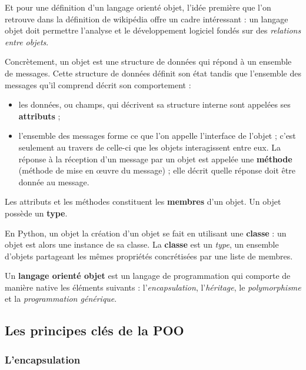 \documentclass[
  letterpaper,
  DIV=11,
  numbers=noendperiod]{scrartcl}
\providecommand{\tightlist}{%
  \setlength{\itemsep}{0pt}\setlength{\parskip}{0pt}}\usepackage{longtable,booktabs,array}
\begin{document}
Et pour une définition d'un langage orienté objet, l'idée première que
l'on retrouve dans la définition de wikipédia offre un cadre intéressant
: un langage objet doit permettre l'analyse et le développement logiciel
fondés sur des \emph{relations entre objets}.

Concrètement, un objet est une structure de données qui répond à un
ensemble de messages. Cette structure de données définit son état tandis
que l'ensemble des messages qu'il comprend décrit son comportement :

\begin{itemize}
\tightlist
\item
  les données, ou champs, qui décrivent sa structure interne sont
  appelées ses \textbf{attributs} ;
\item
  l'ensemble des messages forme ce que l'on appelle l'interface de
  l'objet ; c'est seulement au travers de celle-ci que les objets
  interagissent entre eux. La réponse à la réception d'un message par un
  objet est appelée une \textbf{méthode} (méthode de mise en œuvre du
  message) ; elle décrit quelle réponse doit être donnée au message.
\end{itemize}

Les attributs et les méthodes constituent les \textbf{membres} d'un
objet. Un objet possède un \textbf{type}.

En Python, un objet la création d'un objet se fait en utilisant une
\textbf{classe} : un objet est alors une instance de sa classe. La
\textbf{classe} est un \emph{type}, un ensemble d'objets partageant les
mêmes propriétés concrétisées par une liste de membres.

\begin{description}
\tightlist
\item[\textbf{Langage orienté objet}]
Un \textbf{langage orienté objet} est un langage de programmation qui
comporte de manière native les éléments suivants :
l'\emph{encapsulation}, l'\emph{héritage}, le \emph{polymorphisme} et la
\emph{programmation générique}.
\end{description}

\hypertarget{les-principes-cluxe9s-de-la-poo}{%
\subsection{Les principes clés de la
POO}\label{les-principes-cluxe9s-de-la-poo}}

\hypertarget{lencapsulation}{%
\subsubsection{L'encapsulation}\label{lencapsulation}}
\end{document}
